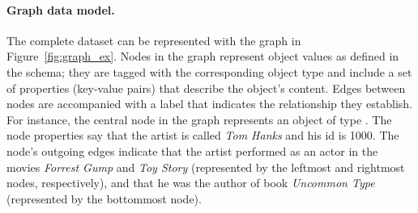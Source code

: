 
\paragraph{Graph data model.}

The complete \goodbois dataset can be represented with the graph in
Figure~\ref{fig:graph_ex}. Nodes in the graph represent object values
as defined in the schema; they are tagged with the corresponding
object type and include a set of properties (key-value pairs) that
describe the object's content. Edges between nodes are accompanied with
a label that indicates the relationship they establish. For instance,
the central node in the graph represents an object of type
\artist. The node properties say that the artist is called {\em Tom Hanks} and his id is 1000.
The node's outgoing edges indicate that the artist 
performed as an actor in the movies \emph{Forrest Gump} and \emph{Toy Story}
(represented by the leftmost and rightmost nodes, respectively), and
that he was the author of book \emph{Uncommon Type} (represented by the
bottommost node).







